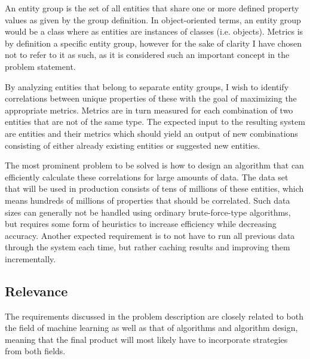 \documentclass[a4paper]{article}
\begin{document}
An entity group is the set of all entities that share one or more defined property values as given by the group definition.
In object-oriented terms, an entity group would be a class where as entities are instances of classes (i.e. objects). Metrics
is by definition a specific entity group, however for the sake of clarity I have chosen not to refer to it as such, as it is
considered such an important concept in the problem statement.

By analyzing entities that belong to separate entity groups, I wish to identify correlations between unique properties of
these with the goal of maximizing the appropriate metrics. Metrics are in turn measured for each combination of two entities
that are not of the same type. The expected input to the resulting system are entities and their metrics which should yield
an output of new combinations consisting of either already existing entities or suggested new entities.

The most prominent problem to be solved is how to design an algorithm that can efficiently calculate these correlations for
large amounts of data. The data set that will be used in production consists of tens of millions of these entities, which
means hundreds of millions of properties that should be correlated. Such data sizes can generally not be handled using
ordinary brute-force-type algorithms, but requires some form of heuristics to increase efficiency while decreasing accuracy.
Another expected requirement is to not have to run all previous data through the system each time, but rather caching results
and improving them incrementally.

\subsection{Relevance}
The requirements discussed in the problem description are closely related to both the field of machine learning as well as
that of algorithms and algorithm design, meaning that the final product will most likely have to incorporate strategies from
both fields.
\end{document}
